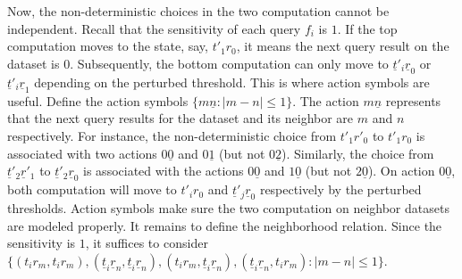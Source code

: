 Now, the non-deterministic choices in the two computation cannot be 
independent. Recall that the sensitivity of each query $f_i$ is
$1$. If the top computation moves to the state, say, $t'_1r_0$, it
means the next query result on the dataset is $0$. Subsequently, the
bottom computation can only move to $\underline{t}'_i\underline{r}_0$
or $\underline{t}'_i\underline{r}_1$ depending on the perturbed
threshold. This is where action symbols are useful. Define the action
symbols $\{ m\underline{n} : |m - n| \leq 1 \}$. The action
$m\underline{n}$ represents that the next query results for the dataset
and its neighbor are $m$ and $n$ respectively. For instance, the
non-deterministic choice from $t'_1r'_0$ to $t'_1r_0$ is associated
with two actions $0\underline{0}$ and $0\underline{1}$ (but not
$0\underline{2}$). Similarly, the choice from
$\underline{t}'_2\underline{r}'_1$ to
$\underline{t}'_2\underline{r}_0$ is associated with the actions
$0\underline{0}$ and $1\underline{0}$ (but not $2\underline{0}$). On
action $0\underline{0}$, both computation will move to $t'_ir_0$ and
$\underline{t}'_j\underline{r}_0$ respectively by the perturbed
thresholds. Action symbols make sure the two computation on neighbor
datasets are modeled properly. It remains to define the neighborhood
relation. Since the sensitivity is $1$, it suffices to consider 
$\{ (t_ir_m, t_ir_m),
    (\underline{t}_i\underline{r}_n, \underline{t}_i\underline{r}_n),
    (t_ir_m, \underline{t}_i\underline{r}_n), 
    (\underline{t}_i\underline{r}_n, t_ir_m) : | m - n | \leq 1 \}$.
